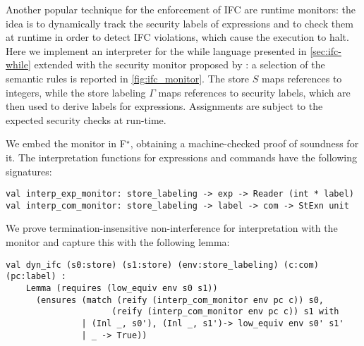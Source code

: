 \documentclass[sigplan,screen]{acmart}\settopmatter{}
\newcommand\fstar{F$^\star$\xspace}
\begin{document}
Another popular technique for the enforcement of IFC are
runtime monitors: the idea is to dynamically track the security labels
of  expressions and to check them at runtime in order to detect  IFC
violations, which cause the execution to halt. Here we implement an interpreter for the while language presented in
\autoref{sec:ifc-while} extended with the security monitor proposed by
\citet{SabelfeldR09}: a selection of the semantic rules is reported in \autoref{fig:ifc_monitor}.
The store $S$ maps references to integers, while the store labeling $\Gamma$
maps references to security labels, which are then used to derive labels for
expressions. Assignments are subject to the expected security checks at
run-time.


We embed the monitor in \fstar, obtaining a machine-checked
proof of soundness for it.
The interpretation functions for expressions and commands have the following
signatures:

\begin{lstlisting}
val interp_exp_monitor: store_labeling -> exp -> Reader (int * label)
val interp_com_monitor: store_labeling -> label -> com -> StExn unit
\end{lstlisting}

We prove termination-insensitive non-interference for interpretation with the
monitor and capture this with the following lemma:

\begin{lstlisting}
val dyn_ifc (s0:store) (s1:store) (env:store_labeling) (c:com) (pc:label) :
    Lemma (requires (low_equiv env s0 s1))
      (ensures (match (reify (interp_com_monitor env pc c)) s0, 
                     (reify (interp_com_monitor env pc c)) s1 with
               | (Inl _, s0'), (Inl _, s1')-> low_equiv env s0' s1'
               | _ -> True))
\end{lstlisting}
\end{document}
